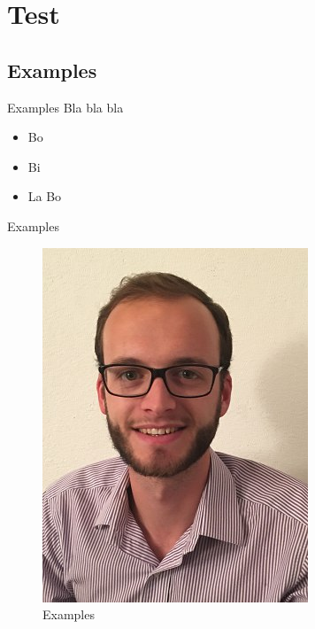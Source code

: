 %
%
\section{Test}
\subsection{Examples}
\begin{frame}{Examples}
Bla bla bla
\begin{itemize}
\item Bo
\item Bi
\item La Bo
\end{itemize}

\end{frame}

\begin{frame}{Examples}
\begin{figure}
\includegraphics[scale=0.06]{pictures/polop}
\caption{Examples}
\end{figure}
\end{frame}
